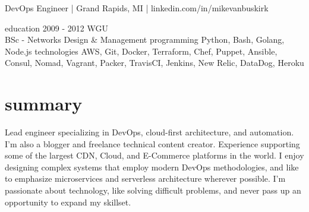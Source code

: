 \documentclass[]{mv_cv}
\begin{document}
       {DevOps Engineer | Grand Rapids, MI | linkedin.com/in/mikevanbuskirk}
 
\begin{sidebar}
 \sideitem
 {education}
 {2009 - 2012 WGU\\BSc - Networks Design \& Management}
 \sideitem
 {programming}
 {Python, Bash, Golang, Node.js}
 \sideitem
 {technologies}
 {AWS, Git, Docker,
 Terraform, Chef,
 Puppet, Ansible,
 Consul, Nomad,
 Vagrant, Packer,
 TravisCI, Jenkins,
 New Relic, DataDog, Heroku}
\end{sidebar}

\section{summary}
\begin{content}
  {
    Lead engineer specializing in DevOps, cloud-first architecture, and automation. I'm also a blogger and freelance technical content creator.
    Experience supporting some of the largest CDN, Cloud, and E-Commerce platforms in the world.
    I enjoy designing complex systems that employ modern DevOps methodologies, and like to emphasize microservices and serverless architecture wherever possible.
    I'm passionate about technology, like solving difficult problems, and never pass up an opportunity to expand my skillset.
  }
\end{content}
\end{document}
